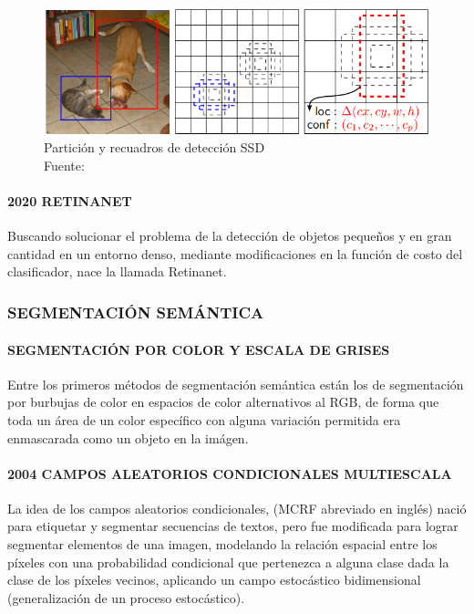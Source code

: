 \begin{figure}[H]
    \centering
	\includegraphics[scale=0.5]{imagenes/ssd}
    \caption[Partición y recuadros de detección SSD]{Partición y recuadros de detección SSD\\Fuente: \citep{liu-ssd}}
\end{figure}

\paragraph{2020 RETINANET}
Buscando solucionar el problema de la detección de objetos pequeños y en gran cantidad en un entorno denso, mediante modificaciones en la función de costo del clasificador, nace la llamada Retinanet. \citep{retinanet}

\subsubsection{SEGMENTACIÓN SEMÁNTICA}

\paragraph{SEGMENTACIÓN POR COLOR Y ESCALA DE GRISES}
Entre los primeros métodos de segmentación semántica están los de segmentación por burbujas de color en espacios de color alternativos al RGB, de forma que toda un área de un color específico con alguna variación permitida era enmascarada como un objeto en la imágen.

\paragraph{2004 CAMPOS ALEATORIOS CONDICIONALES MULTIESCALA}
La idea de los campos aleatorios condicionales, (MCRF abreviado en inglés) nació para etiquetar y segmentar secuencias de textos, pero fue modificada para lograr segmentar elementos de una imagen, modelando la relación espacial entre los píxeles con una probabilidad condicional que pertenezca a alguna clase dada la clase de los píxeles vecinos, aplicando un campo estocástico bidimensional (generalización de un proceso estocástico). \citep{segmentation-crf}


